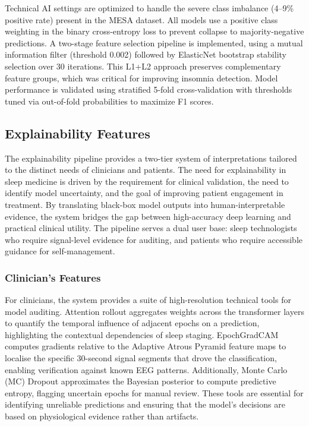 Technical AI settings are optimized to handle the severe class imbalance (4--9\% positive rate) present in the MESA dataset. All models use a positive class weighting in the binary cross-entropy loss to prevent collapse to majority-negative predictions. A two-stage feature selection pipeline is implemented, using a mutual information filter (threshold 0.002) followed by ElasticNet bootstrap stability selection over 30 iterations. This L1+L2 approach preserves complementary feature groups, which was critical for improving insomnia detection. Model performance is validated using stratified 5-fold cross-validation with thresholds tuned via out-of-fold probabilities to maximize F1 scores.

\subsection{Explainability Features}

The explainability pipeline provides a two-tier system of interpretations tailored to the distinct needs of clinicians and patients. The need for explainability in sleep medicine is driven by the requirement for clinical validation, the need to identify model uncertainty, and the goal of improving patient engagement in treatment. By translating black-box model outputs into human-interpretable evidence, the system bridges the gap between high-accuracy deep learning and practical clinical utility. The pipeline serves a dual user base: sleep technologists who require signal-level evidence for auditing, and patients who require accessible guidance for self-management.

\subsubsection{Clinician's Features}

For clinicians, the system provides a suite of high-resolution technical tools for model auditing. Attention rollout aggregates weights across the transformer layers to quantify the temporal influence of adjacent epochs on a prediction, highlighting the contextual dependencies of sleep staging. EpochGradCAM computes gradients relative to the Adaptive Atrous Pyramid feature maps to localise the specific 30-second signal segments that drove the classification, enabling verification against known EEG patterns. Additionally, Monte Carlo (MC) Dropout approximates the Bayesian posterior to compute predictive entropy, flagging uncertain epochs for manual review. These tools are essential for identifying unreliable predictions and ensuring that the model's decisions are based on physiological evidence rather than artifacts.

